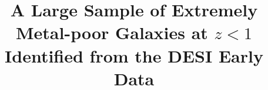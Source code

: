 \documentclass[twocolumn]{aastex631}
\begin{document}
\title{A Large Sample of Extremely Metal-poor Galaxies at $z<1$ Identified from the DESI Early Data}


\end{document}
